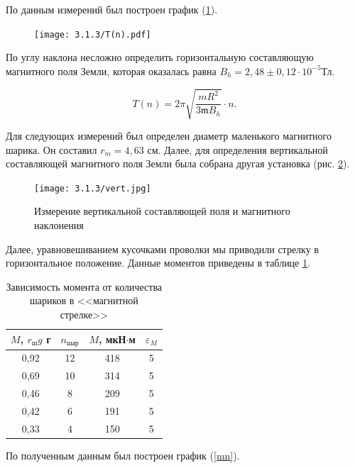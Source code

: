 \documentclass[a4paper,12pt]{article} %
\begin{document}
По данным измерений был построен график (\ref{time}).

\begin{figure}[H]
    \centering
    \texttt{[image: 3.1.3/T(n).pdf]}
    \caption{}
    \label{time}
\end{figure}

По углу наклона несложно определить горизонтальную составляющую магнитного поля Земли, которая оказалась равна  $B_h = 2,48 \pm 0,12 \cdot 10^{-5} \text{Тл}$.

\begin{equation*}
    T(n) = 2\pi \sqrt{\frac{mR^2}{3 \mathfrak{m} B_{h}}} \cdot n.
\end{equation*}

Для следующих измерений был определен диаметр маленького магнитного шарика. Он составил $r_m = 4,63$ см. Далее, для определения вертикальной составляющей магнитного поля Земли была собрана другая установка (рис. \ref{vert}).

\begin{figure}[H]
    \centering
    \texttt{[image: 3.1.3/vert.jpg]}
    \caption{Измерение вертикальной составляющей поля и магнитного наклонения}
    \label{vert}
\end{figure}

Далее, уравновешиванием кусочками проволки мы приводили стрелку в горизонтальное положение. Данные моментов приведены в таблице \ref{moment}.

\begin{table}[H]
    \centering
    \begin{tabular}{|c|c|c|c|}
        \hline $M$, $r_{\text{ш}}g$ г & $n_{\text{шар}}$ & $M$, мкН$\cdot$м & $\varepsilon_M$ \\ \hline 
        0,92 & 12 & 418 & 5 \\ \hline
        0,69 & 10 & 314 & 5 \\ \hline
        0,46 & 8  & 209 & 5 \\ \hline
        0,42 & 6  & 191 & 5 \\ \hline
        0,33 & 4  & 150 & 5 \\ \hline
    \end{tabular}
    \caption{Зависимость момента от количества шариков в <<магнитной стрелке>>}
    \label{moment}
\end{table}

По полученным данным был построен график (\ref{mn}).
\end{document}
